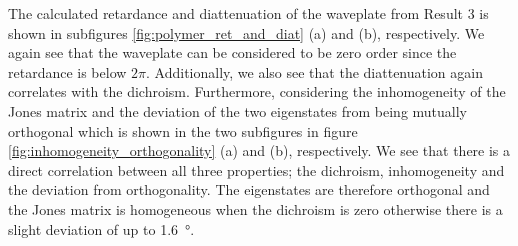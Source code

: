 The calculated retardance and diattenuation of the waveplate from Result 3 is shown in subfigures \ref{fig:polymer_ret_and_diat} (a) and (b), respectively. We again see that the waveplate can be considered to be zero order since the retardance is below $2\pi$. Additionally, we also see that the diattenuation again correlates with the dichroism. Furthermore, considering the inhomogeneity of the Jones matrix and the deviation of the two eigenstates from being mutually orthogonal which is shown in the two subfigures in figure \ref{fig:inhomogeneity_orthogonality} (a) and (b), respectively. We see that there is a direct correlation between all three properties; the dichroism, inhomogeneity and the deviation from orthogonality. The eigenstates are therefore orthogonal and the Jones matrix is homogeneous when the dichroism is zero otherwise there is a slight deviation of up to \SI{1.6}{\degree}. 

